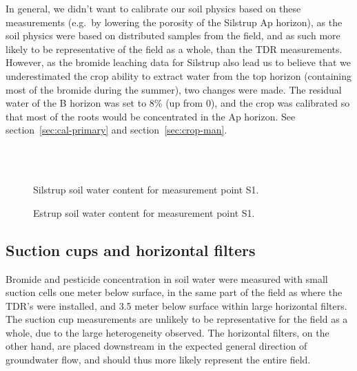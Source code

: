 In general, we didn't want to calibrate our soil physics based on
these measurements (e.g.\ by lowering the porosity of the Silstrup Ap
horizon), as the soil physics were based on distributed samples from
the field, and as such more likely to be representative of the field
as a whole, than the TDR measurements.  However, as the bromide
leaching data for Silstrup also lead us to believe that we
underestimated the crop ability to extract water from the top horizon
(containing most of the bromide during the summer), two changes were
made.  The residual water of the B horizon was set to 8\% (up from 0),
and the crop was calibrated so that most of the roots would be
concentrated in the Ap horizon.  See section~\ref{sec:cal-primary} and
section~\ref{sec:crop-man}.

\begin{figure}[htbp]
  \begin{center}
    \\
    \\
  \end{center}
  \caption{Silstrup soil water content for measurement point S1.}
  \label{fig:Silstrup-theta}
\end{figure}

\begin{figure}[htbp]
  \begin{center}
  \end{center}
  \caption{Estrup soil water content for measurement point S1.}
  \label{fig:Estrup-theta}
\end{figure}

\FloatBarrier
\subsection{Suction cups and horizontal filters}

Bromide and pesticide concentration in soil water were measured with
small suction cells one meter below surface, in the same part of the
field as where the TDR's were installed, and 3.5 meter below surface
within large horizontal filters.  The suction cup measurements are
unlikely to be representative for the field as a whole, due to the
large heterogeneity observed.  The horizontal filters, on the other
hand, are placed downstream in the expected general direction of
groundwater flow, and should thus more likely represent the entire
field.

